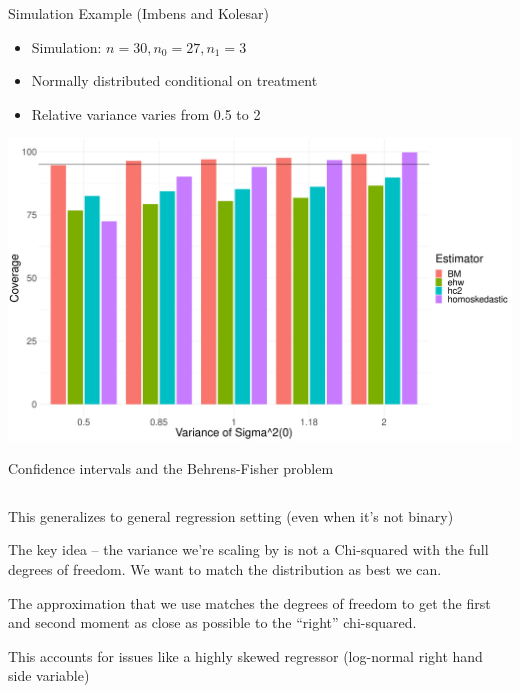 \documentclass[notes,11pt, aspectratio=169]{beamer}
\newenvironment{wideitemize}{\itemize\addtolength{\itemsep}{10pt}}{\enditemize}
\begin{document}
\begin{frame}{Simulation Example (Imbens and Kolesar)}
  \begin{itemize}
  \item Simulation: $n=30, n_{0} = 27, n_{1} = 3$
  \item Normally distributed conditional on treatment
  \item Relative variance varies from 0.5 to 2
  \end{itemize}
  \begin{center}
  \includegraphics[width=0.7\linewidth]{images/imbenskolesar_coverage.pdf}
  \end{center}
\end{frame}


\begin{frame}{Confidence intervals and the Behrens-Fisher problem}
\begin{columns}[T] %
\begin{column}{.8\textwidth}
  \begin{wideitemize}
  \item This generalizes to general regression setting (even when it's not binary)
  \item The key idea -- the variance we're scaling by is not a
    Chi-squared with the full degrees of freedom. We want to match the distribution as best we can.
  \item The approximation that we use matches the degrees of freedom
    to get the first and second moment as close as possible to the ``right'' chi-squared.
  \item This accounts for issues like a highly skewed regressor
    (log-normal right hand side variable)
  \end{wideitemize}
  \end{column}%
  \hfill%
  \begin{column}{.5\textwidth}
  \end{column}
\end{columns}
\end{frame}
\end{document}
